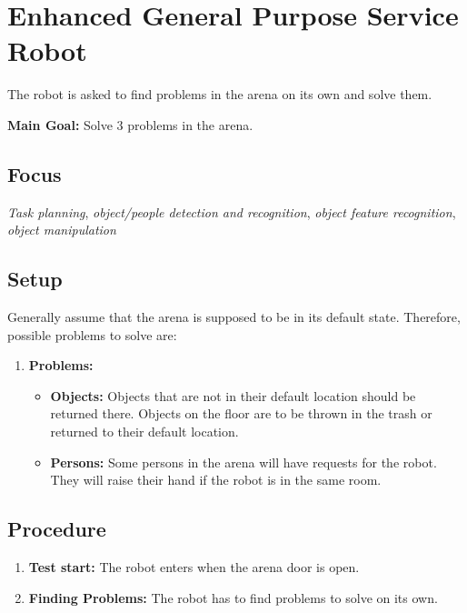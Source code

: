 \section{Enhanced General Purpose Service Robot}
\label{test:egpsr}
The robot is asked to find problems in the arena on its own and solve them.


\noindent \textbf{Main Goal:} Solve 3 problems in the arena.\\


\subsection*{Focus}
\emph{Task planning}, \emph{object/people detection and recognition}, \emph{object feature recognition}, \emph{object manipulation}


\subsection*{Setup}
Generally assume that the arena is supposed to be in its default state. Therefore, possible problems to solve are:
\begin{enumerate}
    \item \textbf{Problems:}
		\begin{itemize}
			\item \textbf{Objects:} Objects that are not in their default location should be returned there. Objects on the floor are to be thrown in the trash or returned to their default location.
			\item \textbf{Persons:} Some persons in the arena will have requests for the robot. They will raise their hand if the robot is in the same room.
		\end{itemize}
\end{enumerate}


\subsection*{Procedure}
\begin{enumerate}[nosep]
	\item \textbf{Test start:} The robot enters when the arena door is open.
	\item \textbf{Finding Problems:} The robot has to find problems to solve on its own.
\end{enumerate}



